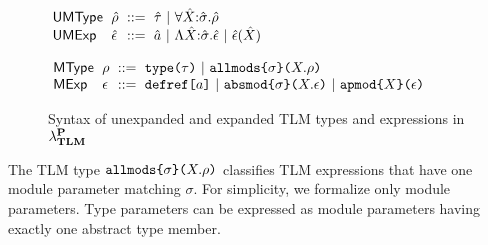 \documentclass[acmsmall,review,anonymous]{acmart}\settopmatter{printfolios=true,printccs=false,printacmref=false}
\begin{document}
\begin{figure}[h]
\small
\begin{minipage}{0.38\textwidth}
$\arraycolsep=3pt\begin{array}{llcl}
\mathsf{UMType} & \urho & ::= & \utau ~\vert~ \allmods{\uX}{\usigma}{\urho}\\
\mathsf{UMExp} & \uepsilon & ::= & \tsmv ~\vert~ \absmod{\uX}{\usigma}{\uepsilon}~\vert~ \apmod{\uepsilon}{\uX}
\end{array}$
\end{minipage}
\begin{minipage}{0.6\textwidth}
$\arraycolsep=3pt\begin{array}{llcl}
\mathsf{MType} & \rho & ::= & \aetype{\tau} ~\vert~ \aeallmods{\sigma}{X}{\rho} \\
\mathsf{MExp} & \epsilon & ::= & \adefref{a} ~\vert~ \aeabsmod{\sigma}{X}{\epsilon} ~\vert~\aeapmod{X}{\epsilon} 
\end{array}$
\end{minipage}
\caption{Syntax of unexpanded and expanded TLM types and expressions in $\mathsf{\lambda}_\textbf{TLM}^\textbf{P}$}
\label{fig:P-macro-expressions-types}
\end{figure}
The TLM type $\texttt{allmods}\texttt{\{}\sigma\texttt{\}(}X.\rho\texttt{)}$ classifies TLM expressions that have one module parameter matching $\sigma$. For simplicity, we formalize only module parameters. Type parameters can be expressed as module parameters having exactly one abstract type member.
\end{document}
